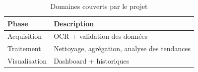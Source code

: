 \begin{table}[H]
\centering
\caption{Domaines couverts par le projet}
\label{tab:domaines_projet}
\begin{tabular}{|l|l|}
\hline
\textbf{Phase} & \textbf{Description} \\ \hline
Acquisition & OCR + validation des données \\ \hline
Traitement & Nettoyage, agrégation, analyse des tendances \\ \hline
Visualisation & Dashboard + historiques \\ \hline
\end{tabular}
\end{table}